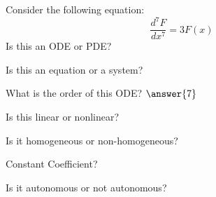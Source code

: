 \documentclass{ximera}
\begin{document}
\begin{exercise}
    Consider the following equation:  
    \[
        \frac{d^7 F}{dx^7} = 3F(x)
    \]
    Is this an ODE or PDE?
    \begin{multipleChoice}
    \end{multipleChoice}
    \begin{problem}
        Is this an equation or a system?
        \begin{multipleChoice}
        \end{multipleChoice}
        
        \begin{problem}
            What is the order of this ODE? $\answer{7}$
            
            \begin{problem}
                Is this linear or nonlinear?
                \begin{multipleChoice}
                \end{multipleChoice}
                
                \begin{problem}
                    Is it homogeneous or non-homogeneous?
                    \begin{multipleChoice}
                    \end{multipleChoice}
                    
                    \begin{problem}
                        Constant Coefficient?
                        \begin{multipleChoice}
                        \end{multipleChoice}
                    \end{problem}
                \end{problem}
            \end{problem}
        \end{problem}
    \end{problem}
    \begin{problem}
        Is it autonomous or not autonomous?
        \begin{multipleChoice}
        \end{multipleChoice}
    \end{problem}
\end{exercise}
\end{document}
